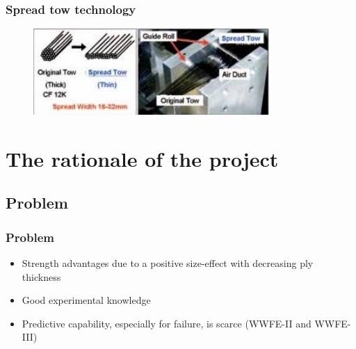 \documentclass[first,firstsupp,lastsupp,handout,last,hyperref,table]{ETHclass}
\begin{document}

\begin{frame}
\frametitle{Spread tow technology}
\vspace{-.5cm}
\centering
\begin{figure}
\centering
\includegraphics[width=0.8\textwidth]{spread_tow_technology_scheme}
\label{fig:design_workflow}
\end{figure}
\end{frame}


\section{The rationale of the project}

\subsection{Problem}

\begin{frame}
\frametitle{Problem}
\begin{itemize}
    \item Strength advantages due to a positive size-effect with decreasing ply thickness~\cite{RobinAmacherWayneSmithClemensDransfeldJohnBotsis2014}
    \item Good experimental knowledge
    \item Predictive capability, especially for failure, is scarce (WWFE-II and WWFE-III)~\cite{RalfCuntze}
\end{itemize}
\end{frame}
\end{document}
